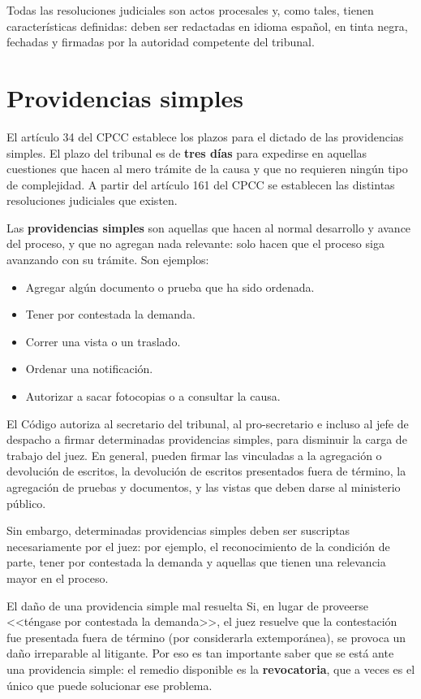 \documentclass[12pt,oneside]{book}
\begin{document}
Todas las resoluciones judiciales son actos procesales y, como tales, tienen características definidas: deben ser redactadas en idioma español, en tinta negra, fechadas y firmadas por la autoridad competente del tribunal.

\section{Providencias simples}

El artículo 34 del CPCC establece los plazos para el dictado de las providencias simples. El plazo del tribunal es de \textbf{tres días} para expedirse en aquellas cuestiones que hacen al mero trámite de la causa y que no requieren ningún tipo de complejidad. A partir del artículo 161 del CPCC se establecen las distintas resoluciones judiciales que existen.

Las \textbf{providencias simples} son aquellas que hacen al normal desarrollo y avance del proceso, y que no agregan nada relevante: solo hacen que el proceso siga avanzando con su trámite. Son ejemplos:

\begin{itemize}
    \item Agregar algún documento o prueba que ha sido ordenada.
    \item Tener por contestada la demanda.
    \item Correr una vista o un traslado.
    \item Ordenar una notificación.
    \item Autorizar a sacar fotocopias o a consultar la causa.
\end{itemize}

El Código autoriza al secretario del tribunal, al pro-secretario e incluso al jefe de despacho a firmar determinadas providencias simples, para disminuir la carga de trabajo del juez. En general, pueden firmar las vinculadas a la agregación o devolución de escritos, la devolución de escritos presentados fuera de término, la agregación de pruebas y documentos, y las vistas que deben darse al ministerio público.

Sin embargo, determinadas providencias simples deben ser suscriptas necesariamente por el juez: por ejemplo, el reconocimiento de la condición de parte, tener por contestada la demanda y aquellas que tienen una relevancia mayor en el proceso.

\begin{example}{El daño de una providencia simple mal resuelta}
Si, en lugar de proveerse <<téngase por contestada la demanda>>, el juez resuelve que la contestación fue presentada fuera de término (por considerarla extemporánea), se provoca un daño irreparable al litigante. Por eso es tan importante saber que se está ante una providencia simple: el remedio disponible es la \textbf{revocatoria}, que a veces es el único que puede solucionar ese problema.
\end{example}
\end{document}
